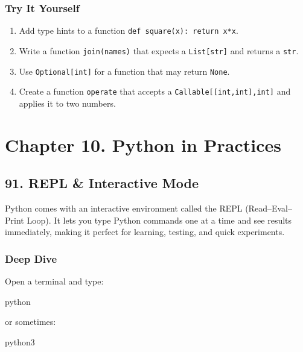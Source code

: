 \documentclass[
  letterpaper,
  DIV=11,
  numbers=noendperiod]{scrreprt}
\newenvironment{Shaded}{\begin{snugshade}}{\end{snugshade}}
\newcommand{\ExtensionTok}[1]{\textcolor[rgb]{0.00,0.23,0.31}{#1}}
\providecommand{\tightlist}{%
  \setlength{\itemsep}{0pt}\setlength{\parskip}{0pt}}
\begin{document}
\subsubsection{Try It Yourself}\label{try-it-yourself-89}

\begin{enumerate}
\def\labelenumi{\arabic{enumi}.}
\tightlist
\item
  Add type hints to a function \texttt{def\ square(x):\ return\ x*x}.
\item
  Write a function \texttt{join(names)} that expects a
  \texttt{List{[}str{]}} and returns a \texttt{str}.
\item
  Use \texttt{Optional{[}int{]}} for a function that may return
  \texttt{None}.
\item
  Create a function \texttt{operate} that accepts a
  \texttt{Callable{[}{[}int,int{]},int{]}} and applies it to two
  numbers.
\end{enumerate}

\section{Chapter 10. Python in
Practices}\label{chapter-10.-python-in-practices}

\subsection{91. REPL \& Interactive Mode}\label{repl-interactive-mode}

Python comes with an interactive environment called the REPL
(Read--Eval--Print Loop). It lets you type Python commands one at a time
and see results immediately, making it perfect for learning, testing,
and quick experiments.

\subsubsection{Deep Dive}\label{deep-dive-90}

Open a terminal and type:

\begin{Shaded}
\begin{Highlighting}[]
\ExtensionTok{python}
\end{Highlighting}
\end{Shaded}

or sometimes:

\begin{Shaded}
\begin{Highlighting}[]
\ExtensionTok{python3}
\end{Highlighting}
\end{Shaded}
\end{document}
